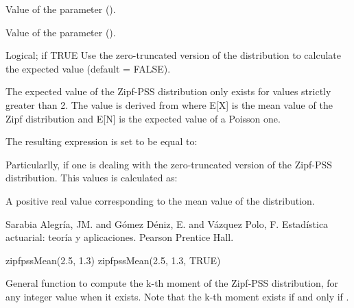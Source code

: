 \documentclass[letterpaper]{book}
\begin{document}
%
\begin{Arguments}
\begin{ldescription}
\item[\code{alpha}] Value of the \eqn{\alpha}{} parameter ().

\item[\code{lambda}] Value of the \eqn{\lambda}{} parameter ().

\item[\code{isTruncated}] Logical; if TRUE Use the zero-truncated version of the distribution to calculate the expected value (default = FALSE).
\end{ldescription}
\end{Arguments}
%
\begin{Details}\relax
The expected value of the Zipf-PSS distribution only exists for \eqn{\alpha}{} values strictly
greater than 2. The value is derived from  where E[X] is the mean value
of the Zipf distribution and E[N] is the expected value of a Poisson one.

The resulting expression is set to be equal to:

Particularlly, if one is dealing with the zero-truncated version of the Zipf-PSS distribution.
This values is calculated as:
\end{Details}
%
\begin{Value}
A positive real value corresponding to the mean value of the distribution.
\end{Value}
%
\begin{References}\relax

Sarabia Alegría, JM. and Gómez Déniz, E. and Vázquez Polo, F. Estadística actuarial: teoría y aplicaciones. Pearson Prentice Hall.

\end{References}
%
\begin{Examples}
\begin{ExampleCode}
zipfpssMean(2.5, 1.3)
zipfpssMean(2.5, 1.3, TRUE)
\end{ExampleCode}
\end{Examples}
%
\begin{Description}\relax
General function to compute the k-th moment of the Zipf-PSS distribution, for any integer value 
when it exists. Note that the k-th moment exists if and only if  .
\end{Description}
\end{document}
